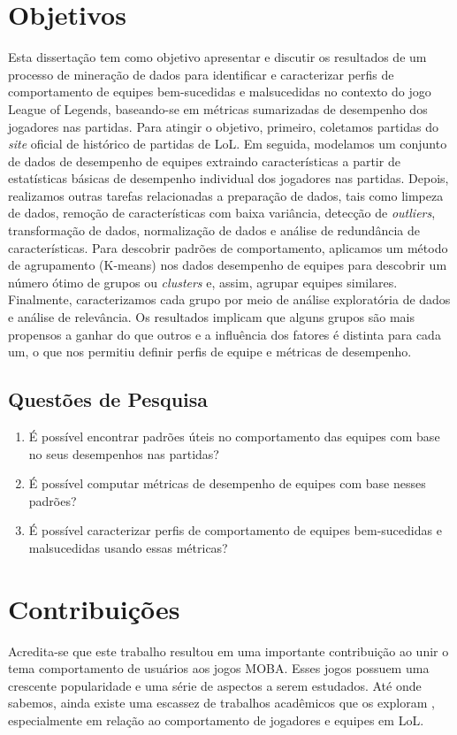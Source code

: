 \section{Objetivos}
Esta dissertação tem como objetivo apresentar e discutir os resultados de um processo de mineração de dados para identificar e caracterizar perfis de comportamento de equipes bem-sucedidas e malsucedidas no contexto do jogo League of Legends, baseando-se em métricas sumarizadas de desempenho dos jogadores nas partidas. Para atingir o objetivo, primeiro, coletamos partidas do \textit{site} oficial de histórico de partidas de LoL. Em seguida, modelamos um conjunto de dados de desempenho de equipes extraindo características a partir de estatísticas básicas de desempenho individual dos jogadores nas partidas. Depois, realizamos outras tarefas relacionadas a preparação de dados, tais como limpeza de dados, remoção de características com baixa variância, detecção de \textit{outliers}, transformação de dados, normalização de dados e análise de redundância de características. Para descobrir padrões de comportamento, aplicamos um método de agrupamento (K-means) nos dados desempenho de equipes para descobrir um número ótimo de grupos ou \textit{clusters} e, assim, agrupar equipes similares. Finalmente, caracterizamos cada grupo por meio de análise exploratória de dados e análise de relevância. Os resultados implicam que alguns grupos são mais propensos a ganhar do que outros e a influência dos fatores é distinta para cada um, o que nos permitiu definir perfis de equipe e métricas de desempenho.

\subsection{Questões de Pesquisa}

\begin{enumerate}[label=(\roman*)]
  \item É possível encontrar padrões úteis no comportamento das equipes com base no seus desempenhos nas partidas?
  \item É possível computar métricas de desempenho de equipes com base nesses padrões?
  \item É possível caracterizar perfis de comportamento de equipes bem-sucedidas e malsucedidas usando essas métricas?
\end{enumerate}

\section{Contribuições}
Acredita-se que este trabalho resultou em uma importante contribuição ao unir o tema comportamento de usuários aos jogos MOBA. Esses jogos possuem uma crescente popularidade e uma série de aspectos a serem estudados. Até onde sabemos, ainda existe uma escassez de trabalhos acadêmicos que os exploram \cite{drachen2014skill} \cite{ong2015player}, especialmente em relação ao comportamento de jogadores e equipes em LoL.

